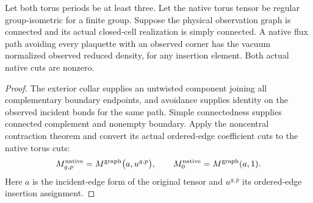 \begin{lemma}
    \label{lem:peps_native_avoiding_flux_density}
    \leanok
    Let both torus periods be at least three. Let the native torus tensor be regular group-isometric for a finite
    group. Suppose the physical observation graph is connected and its
    actual closed-cell realization is simply connected. A native flux
    path avoiding every plaquette with an observed corner has the vacuum
    normalized observed reduced density, for any insertion element.
    Both actual native cuts are nonzero.
\end{lemma}
\begin{proof}\leanok
    The exterior collar supplies an untwisted component joining all
    complementary boundary endpoints, and avoidance supplies identity
    on the observed incident bonds for the same path. Simple connectedness
    supplies connected complement and nonempty boundary. Apply the
    noncentral contraction theorem and convert its actual ordered-edge
    coefficient cuts to the native torus cuts:
    \begin{align}
        M_{g,p}^{\rm native}
        =M^{\rm graph}\bigl(a,u^{g,p}\bigr),\qquad
        M_0^{\rm native}=M^{\rm graph}(a,1).
        \label{eq:peps_avoiding_native_cut_conversion}
    \end{align}
    Here $a$ is the incident-edge form of the original tensor and
    $u^{g,p}$ its ordered-edge insertion assignment.
\end{proof}

